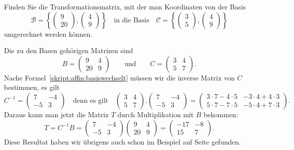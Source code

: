 \begin{beispiel}
Finden Sie die Transformationsmatrix, mit der man Koordinaten von der
Basis
\[
\mathcal{B}=\left\{
\begin{pmatrix}9\\20\end{pmatrix},
\begin{pmatrix}4\\9\end{pmatrix}
\right\}
\quad\text{in die Basis}\quad
\mathcal{C}=\left\{
\begin{pmatrix}3\\5\end{pmatrix},
\begin{pmatrix}4\\9\end{pmatrix}
\right\}
\]
umgerechnet werden können.

Die zu den Basen gehörigen Matrizen sind
\[
B
=
\begin{pmatrix}9&4\\20&9\end{pmatrix}
\qquad\text{und}\qquad
C
=
\begin{pmatrix}3&4\\5&7\end{pmatrix}.
\]
Nache Formel~\eqref{skript:affin:basiswechselt} müssen wir die inverse
Matrix von $C$ bestimmen, es gilt
\[
C^{-1}
=
\begin{pmatrix}7&-4\\-5&3\end{pmatrix}
\quad\text{denn es gilt}\quad
\begin{pmatrix}3&4\\5&7\end{pmatrix}.
\begin{pmatrix}7&-4\\-5&3\end{pmatrix}
=
\begin{pmatrix}
3\cdot 7-4\cdot 5&-3\cdot 4+4\cdot 3\\
5\cdot 7-7\cdot 5&-5\cdot 4+7\cdot 3
\end{pmatrix}.
\]
Daraus kann man jetzt die Matrix $T$ durch Multiplikation mit $B$ bekommen:
\[
T=C^{-1}B = 
\begin{pmatrix}7&-4\\-5&3\end{pmatrix}
\begin{pmatrix}9&4\\20&9\end{pmatrix}
=
\begin{pmatrix}
-17&-8\\
15& 7
\end{pmatrix}.
\]
Diese Resultat haben wir übrigens auch schon im Beispiel auf Seite
\pageref{skript:lingl:simultan-beispiel}
gefunden.
\end{beispiel}

